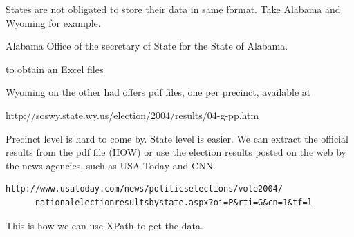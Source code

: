 
States are not obligated to store their data in same format.
Take Alabama and Wyoming for example. 

Alabama
Office of the secretary of State for the State of Alabama.



to obtain an Excel files

Wyoming on the other had offers pdf files, one per precinct,
available at 

http://soswy.state.wy.us/election/2004/results/04-g-pp.htm

Precinct level is hard to come by. 
State level is easier. We can extract the official results from
the pdf file (HOW)
or use the election results posted on the web by the 
news agencies, such as USA Today and CNN. 
\begin{verbatim}
http://www.usatoday.com/news/politicselections/vote2004/
      nationalelectionresultsbystate.aspx?oi=P&rti=G&cn=1&tf=l
\end{verbatim}


This is how we can use XPath to get the data.

